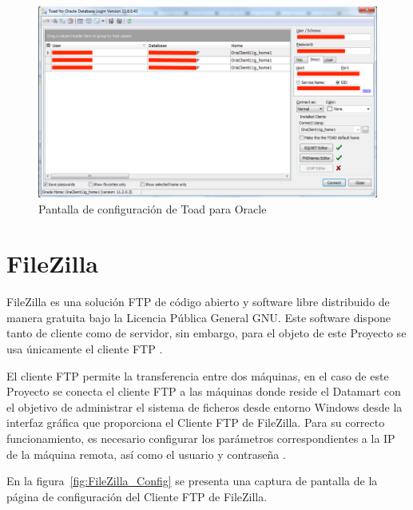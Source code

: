 \documentclass[a4paper, 12pt]{book}
\begin{document}
\begin{figure}
   \centering
   \includegraphics[width=12cm, keepaspectratio]{img/toadconfig}
   \caption{Pantalla de configuración de Toad para Oracle}
   \label{fig:Toad_Config}
\end{figure}

\section{FileZilla}
\label{sec:FileZilla}
FileZilla es una solución FTP de código abierto y software libre distribuido de manera gratuita bajo la Licencia Pública General GNU. Este software dispone tanto de cliente como de servidor, sin embargo, para el objeto de este Proyecto se usa únicamente el cliente FTP \cite{filezilla1}.

El cliente FTP permite la transferencia entre dos máquinas, en el caso de este Proyecto se conecta el cliente FTP a las máquinas donde reside el Datamart con el objetivo de administrar el sistema de ficheros desde entorno Windows desde la interfaz gráfica que proporciona el Cliente FTP de FileZilla. Para su correcto funcionamiento, es necesario configurar los parámetros correspondientes a la IP de la máquina remota, así como el usuario y contraseña \cite{filezilla2}.

En la figura~\ref{fig:FileZilla_Config} se presenta una captura de pantalla de la página de configuración del Cliente FTP de FileZilla.
\end{document}
